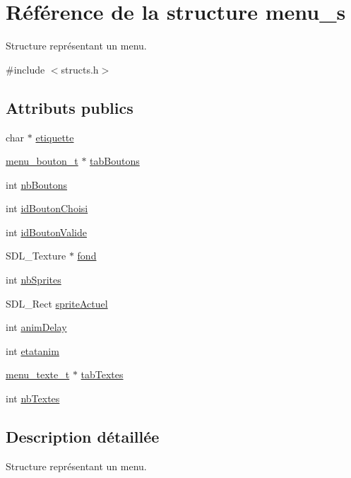 \hypertarget{structmenu__s}{}\section{Référence de la structure menu\+\_\+s}
\label{structmenu__s}


Structure représentant un menu.  




{\ttfamily \#include $<$structs.\+h$>$}

\subsection*{Attributs publics}
\begin{DoxyCompactItemize}
\item 
char $\ast$ \hyperlink{structmenu__s_a23bc02d966064967f230d451c2bb92e2}{etiquette}
\item 
\hyperlink{structmenu__bouton__s}{menu\+\_\+bouton\+\_\+t} $\ast$ \hyperlink{structmenu__s_a0f2f124fed40b189dfce498589c686ed}{tab\+Boutons}
\item 
int \hyperlink{structmenu__s_a19e82f63dd8d79abd915eef8942983b7}{nb\+Boutons}
\item 
int \hyperlink{structmenu__s_a19649b307665fbc360e9aa9afd02561f}{id\+Bouton\+Choisi}
\item 
int \hyperlink{structmenu__s_a0fb7af2c7e862a54742c26c6e34f6a06}{id\+Bouton\+Valide}
\item 
S\+D\+L\+\_\+\+Texture $\ast$ \hyperlink{structmenu__s_ab50ffcca733b1e0335a823c2c5a72530}{fond}
\item 
int \hyperlink{structmenu__s_a799866db5fd1be6862202346d260333d}{nb\+Sprites}
\item 
S\+D\+L\+\_\+\+Rect \hyperlink{structmenu__s_a441c56b239a287ebcd898db8625659b3}{sprite\+Actuel}
\item 
int \hyperlink{structmenu__s_afaacd979fb5f5ab3b1bc99dcf986dbbd}{anim\+Delay}
\item 
int \hyperlink{structmenu__s_a27260e298d7eabcbdcef22b7cfdf15c8}{etatanim}
\item 
\hyperlink{structmenu__texte__s}{menu\+\_\+texte\+\_\+t} $\ast$ \hyperlink{structmenu__s_adcc943c449636cca0974499cb03d289b}{tab\+Textes}
\item 
int \hyperlink{structmenu__s_afdbe31467b3f6d712b7f3b0a783987de}{nb\+Textes}
\end{DoxyCompactItemize}


\subsection{Description détaillée}
Structure représentant un menu. 


